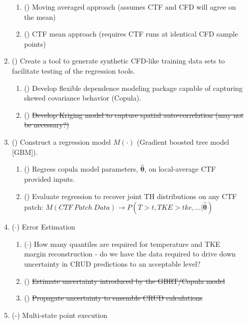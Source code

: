 \begin{enumerate}
\begin{enumerate}
        \begin{enumerate}
            \item (\checkmark) Moving averaged approach (assumes CTF and CFD will agree on the mean)
            \item (\checkmark) CTF mean approach (requires CTF runs at identical CFD sample points)
        \end{enumerate}
        \item (\checkmark) Create a tool to generate synthetic CFD-like training data sets to facilitate
            testing of the regression tools.
        \begin{enumerate}
            \item (\checkmark) Develop flexible dependence modeling package capable of capturing skewed covariance behavior (Copula).
            \item (\xmark) \sout{Develop Kriging model to capture spatial auto-correlation (may not be necessary?)}
        \end{enumerate}
        \item (\checkmark) Construct a regression model $M(\cdot)$ (Gradient boosted tree model [GBM]).
        \begin{enumerate}
            \item (\checkmark) Regress copula model parameters, $\bm{\hat\theta}$, on local-average CTF provided inputs.
            \item (\checkmark) Evaluate regression to recover joint TH distributions on any CTF patch:
                $M(CTF\ Patch\ Data) \rightarrow {P(T>t,TKE>tke,...|\bm{\hat\theta})}$
        \end{enumerate}
        \item ($\cdot$) Error Estimation
        \begin{enumerate}
        	\item ($\cdot$) How many quantiles are required for temperature and TKE margin reconstruction
                                - do we have the data required to drive down uncertainty in CRUD predictions to an acceptable level?
                \item (\xmark) \sout{Estimate uncertainty introduced by the GBRT/Copula model}
            \item (\xmark) \sout{Propagate uncertainty to ensemble CRUD calculations}
        \end{enumerate}
        \item (\checkmark-) Multi-state point execution

\end{enumerate}
\end{enumerate}
